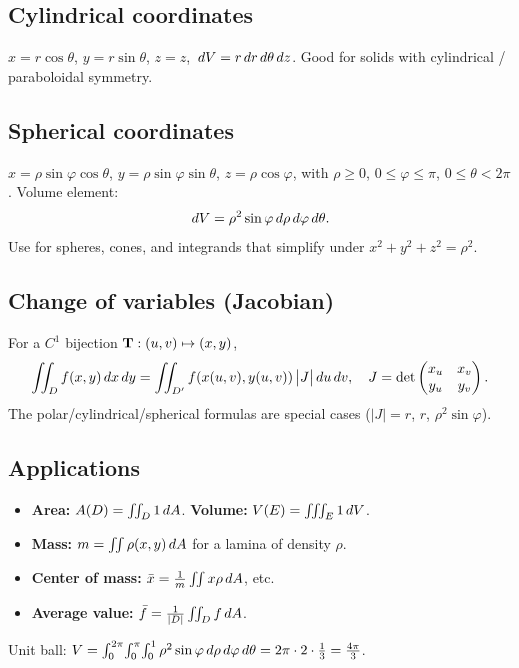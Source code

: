 \subsection{Cylindrical coordinates}
$x = r\cos\theta$, $y = r\sin\theta$, $z = z$, $\,dV = r \,dr \,d\theta \,dz$.
Good for solids with cylindrical / paraboloidal symmetry.

\subsection{Spherical coordinates}
$x = \rho \sin\varphi \cos\theta$, $y = \rho \sin\varphi \sin\theta$, $z = \rho \cos\varphi$, with $\rho \ge 0$, $0 \le \varphi \le \pi$, $0 \le \theta < 2\pi$. Volume element:
\[ \,dV = \rho^2 \sin\varphi \,d\rho \,d\varphi \,d\theta. \]
Use for spheres, cones, and integrands that simplify under $x^2+y^2+z^2 = \rho^2$.

\subsection{Change of variables (Jacobian)}
For a $C^1$ bijection $\mathbf{T} : (u,v) \mapsto (x,y)$,
\[ \iint_D f(x,y) \,dx \,dy = \iint_{D'} f(x(u,v), y(u,v)) \, \bigl| J \bigr| \,du \,dv, \quad
J = \det \begin{pmatrix} x_u & x_v \\ y_u & y_v \end{pmatrix}. \]
The polar/cylindrical/spherical formulas are special cases ($|J| = r$, $r$, $\rho^2 \sin\varphi$).

\subsection{Applications}
\begin{itemize}[leftmargin=*,nosep]
  \item \textbf{Area:} $A(D) = \iint_D 1 \,dA$. \quad \textbf{Volume:} $V(E) = \iiint_E 1 \,dV$.
  \item \textbf{Mass:} $m = \iint \rho(x,y) \,dA$ for a lamina of density $\rho$.
  \item \textbf{Center of mass:} $\bar x = \tfrac{1}{m}\iint x \rho \,dA$, etc.
  \item \textbf{Average value:} $\bar f = \tfrac{1}{|D|} \iint_D f \,dA$.
\end{itemize}

\begin{example}
Unit ball: $V = \int_0^{2\pi}\!\int_0^{\pi}\!\int_0^1 \rho^2 \sin\varphi \,d\rho \,d\varphi \,d\theta
= 2\pi \cdot 2 \cdot \tfrac{1}{3} = \tfrac{4\pi}{3}$.
\end{example}
